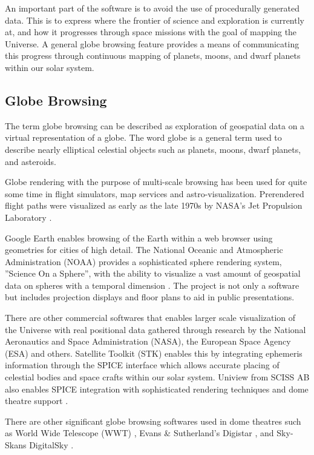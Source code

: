 An important part of the software is to avoid the use of procedurally generated data. This is to express where the frontier of science and exploration is currently at, and how it progresses through space missions with the goal of mapping the Universe. A general globe browsing feature provides a means of communicating this progress through continuous mapping of planets, moons, and dwarf planets within our solar system.

\subsection{Globe Browsing}

The term globe browsing can be described as exploration of geospatial data on a virtual representation of a globe. The word globe is a general term used to describe nearly elliptical celestial objects such as planets, moons, dwarf planets, and asteroids.

Globe rendering with the purpose of multi-scale browsing has been used for quite some time in flight simulators, map services and astro-visualization. Prerendered flight paths were visualized as early as the late 1970s by NASA's Jet Propulsion Laboratory \cite{cozzi11}. 

Google Earth \cite{googlemaps} enables browsing of the Earth within a web browser using geometries for cities of high detail. The National Oceanic and Atmospheric Administration (NOAA) provides a sophisticated sphere rendering system, ''Science On a Sphere'', with the ability to visualize a vast amount of geospatial data on spheres with a temporal dimension \cite{sos}. The project is not only a software but includes projection displays and floor plans to aid in public presentations.

There are other commercial softwares that enables larger scale visualization of the Universe with real positional data gathered through research by the National Aeronautics and Space Administration (NASA), the European Space Agency (ESA) and others. Satellite Toolkit (STK) enables this by integrating ephemeris information through the SPICE interface \cite{spice} which allows accurate placing of celestial bodies and space crafts within our solar system. Uniview from SCISS AB also enables SPICE integration with sophisticated rendering techniques and dome theatre support \cite{uniview}.

There are other significant globe browsing softwares used in dome theatres such as World Wide Telescope (WWT) \cite{wwt}, Evans \& Sutherland's Digistar \cite{digistar}, and Sky-Skans DigitalSky \cite{digitalsky}.

